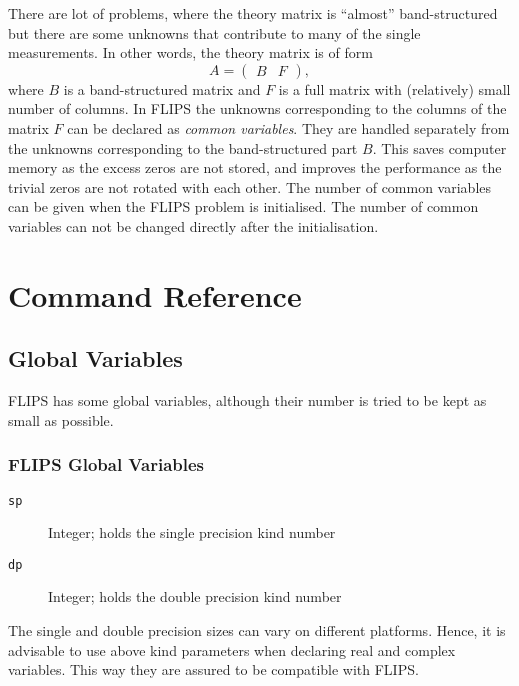 \documentclass[a4paper,twoside]{refrep}
\newcommand{\aitem}[1]{\item[{\tt #1}]}
\newenvironment{arglist}
	{\begin{description}}
	{\end{description}}
\begin{document}
There are lot of problems, where the theory matrix is ``almost'' band-structured but there are some unknowns that contribute to many of the single measurements. In other words, the theory matrix is of form
\begin{equation}
A = \begin{pmatrix}
B & F
\end{pmatrix},
\end{equation}
where $B$ is a band-structured matrix and $F$ is a full matrix with (relatively) small number of columns. In FLIPS the unknowns corresponding to the columns of the matrix $F$ can be declared as \emph{common variables}. They are handled separately from the unknowns corresponding to the band-structured part $B$. This saves computer memory as the excess zeros are not stored, and improves the performance as the trivial zeros are not rotated with each other. The number of common variables can be given when the FLIPS problem is initialised. The number of common variables can not be changed directly after the initialisation.


\part{Command Reference}

\chapter{Global Variables}

FLIPS has some global variables, although their number is tried to be kept as small as possible. 

\section*{FLIPS Global Variables}


\begin{arglist}
\aitem{sp} Integer; holds the single precision kind number
\aitem{dp} Integer; holds the double precision kind number
\end{arglist}

\attention The single and double precision sizes can vary on different platforms. Hence, it is advisable to use above kind parameters when declaring real and complex variables. This way they are assured to be compatible with FLIPS.

\end{document}
